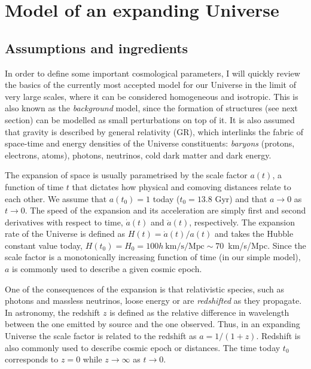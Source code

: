 \section{Model of an expanding Universe}
\label{intro:model}

    \subsection{Assumptions and ingredients}
    \label{intro:model:ingredients}

    In order to define some important cosmological parameters, I will quickly review
    the basics of the currently most accepted model for our Universe in the limit of 
    very large scales, where it can be considered homogeneous and isotropic. 
    This is also known as the \emph{background} model, since the formation of structures 
    (see next section) can
    be modelled as small perturbations on top of it. 
    It is also assumed that gravity is 
    described by general relativity (GR), which interlinks the fabric of space-time and 
    energy densities of the Universe constituents: 
    \emph{baryons} (protons, electrons, atoms), 
    photons, neutrinos, cold dark matter and dark energy. 

    The expansion of space is usually parametrised by the scale factor $a(t)$, 
    a function of time $t$ that dictates how physical and comoving distances 
    relate to each other. We assume that $a(t_0) = 1$ today ($t_0 = 13.8$ Gyr) 
    and that $a \rightarrow 0$ as $t \rightarrow 0$. The speed of the expansion
    and its acceleration are simply first and second derivatives with 
    respect to time, $\dot{a}(t)$ and $\ddot{a}(t)$, respectively. 
    The expansion rate of the Universe is defined
    as $H(t) = \dot{a}(t)/a(t)$ and takes the Hubble constant value today, 
    $H(t_0) = H_0 = 100 h ~ \mathrm{km/s/Mpc} \sim 70$~km/s/Mpc. 
    Since the scale factor is a monotonically increasing function of time 
    (in our simple model), $a$ is commonly used to describe a given cosmic epoch. 

    One of the consequences of the expansion is that relativistic species, such 
    as photons and massless neutrinos, loose energy or are \emph{redshifted} as they 
    propagate. In astronomy, the redshift $z$ is defined as the relative difference
    in wavelength between the one emitted by source and the one observed.  
    Thus, in an expanding Universe the scale factor is related to the redshift as 
    $a = 1/(1+z)$. Redshift is also commonly used to describe cosmic epoch or distances.
    The time today $t_0$ corresponds to $z=0$ while $z \rightarrow \infty$ as $t \rightarrow 0$. 

